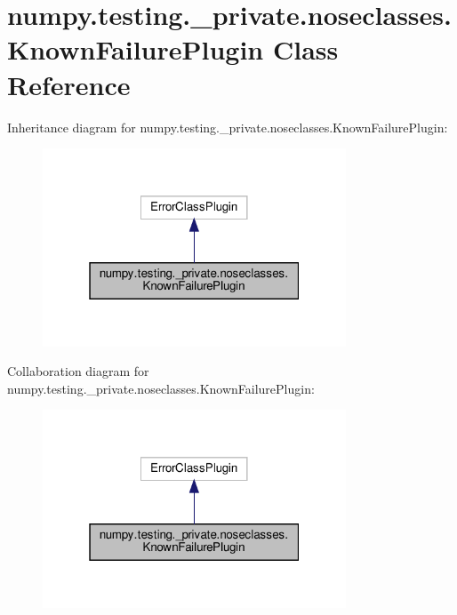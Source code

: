 \hypertarget{classnumpy_1_1testing_1_1__private_1_1noseclasses_1_1KnownFailurePlugin}{}\section{numpy.\+testing.\+\_\+private.\+noseclasses.\+Known\+Failure\+Plugin Class Reference}
\label{classnumpy_1_1testing_1_1__private_1_1noseclasses_1_1KnownFailurePlugin}


Inheritance diagram for numpy.\+testing.\+\_\+private.\+noseclasses.\+Known\+Failure\+Plugin\+:
\nopagebreak
\begin{figure}[H]
\begin{center}
\leavevmode
\includegraphics[width=256pt]{classnumpy_1_1testing_1_1__private_1_1noseclasses_1_1KnownFailurePlugin__inherit__graph}
\end{center}
\end{figure}


Collaboration diagram for numpy.\+testing.\+\_\+private.\+noseclasses.\+Known\+Failure\+Plugin\+:
\nopagebreak
\begin{figure}[H]
\begin{center}
\leavevmode
\includegraphics[width=256pt]{classnumpy_1_1testing_1_1__private_1_1noseclasses_1_1KnownFailurePlugin__coll__graph}
\end{center}
\end{figure}
